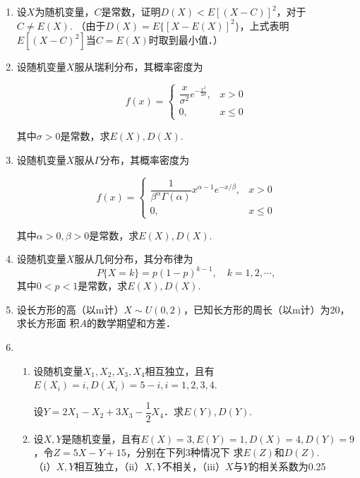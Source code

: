 \documentclass[10pt,a4paper]{article}
\begin{document}
\begin{enumerate}
    \item 设$X$为随机变量，$C$是常数，证明$D(X)<E[(X-C)]^2$，对于$C\neq E(X)$.
    （由于$D(X)=E\{[X-E(X)]^2\}$，上式表明$E[(X-C)^2]$当$C=E(X)$时取到最小值．）


    \item 设随机变量$X$服从瑞利分布，其概率密度为
    \vspace{-0.5cm}
    \begin{spacing}{2.0}
    $$f(x)=\left\{\begin{array}{ll}
        \dfrac{x}{\sigma^2}e^{-\frac{x^{\scriptscriptstyle 2}}{2\sigma}}, & x>0\\
        0, & x\leq 0
    \end{array}\right.$$
    \end{spacing}
    \vspace{-0.5cm}
    其中$\sigma>0$是常数，求$E(X),D(X)$.


    \item 设随机变量$X$服从$\Gamma$分布，其概率密度为
    \vspace{-0.5cm}
    \begin{spacing}{2.0}
    $$f(x)=\left\{\begin{array}{ll}
        \dfrac{1}{\beta^\alpha \Gamma(\alpha)}x^{\alpha-1}e^{-x/\beta}, & x>0\\
        0, & x\leq 0
    \end{array}\right.$$
    \end{spacing}
    \vspace{-0.5cm}
    其中$\alpha>0,\beta>0$是常数，求$E(X),D(X)$.



    \item 设随机变量$X$服从几何分布，其分布律为
    $$P\{X=k\}=p(1-p)^{k-1},\quad k=1,2,\cdots,$$
    其中$0<p<1$是常数，求$E(X),D(X)$.



    \item 设长方形的高（以m计）$X\sim U(0,2)$，已知长方形的周长（以m计）为20，求长方形面
    积$A$的数学期望和方差．


    \item \begin{enumerate}
        \item 设随机变量$X_1,X_2,X_3,X_4$相互独立，且有$E(X_i)=i,D(X_i)=5-i,i=1,2,3,4$.
        \vspace{-0.2cm}
        \begin{spacing}{2.0}
        设$Y=2X_1-X_2+3X_3-\dfrac{1}{2}X_4$．求$E(Y),D(Y)$.
        \end{spacing}
        \vspace{-0.2cm}
    \item 设$X,Y$是随机变量，且有$E(X)=3,E(Y)=1,D(X)=4,D(Y)=9$，令$Z=5X-Y+15$，分别在下列3种情况下
    求$E(Z)$和$D(Z)$.\\
    （i）$X,Y$相互独立，（ii）$X,Y$不相关，（iii）$X$与$Y$的相关系数为0.25
    \end{enumerate}




\end{enumerate}
\end{document}
